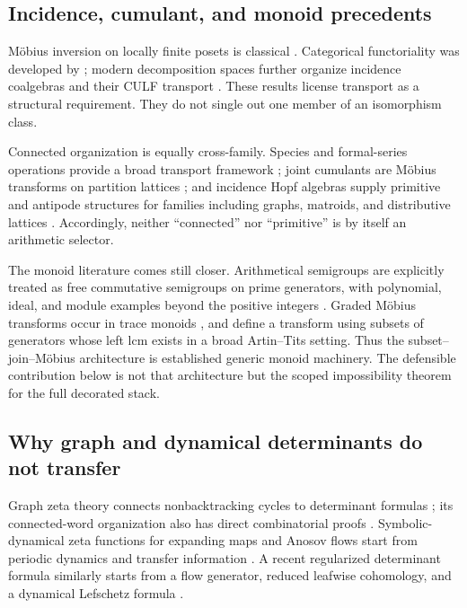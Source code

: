 \subsection{Incidence, cumulant, and monoid precedents}

M{\"o}bius inversion on locally finite posets is classical
\citep{Rota1964}.  Categorical functoriality was developed by
\citet{ContentLemayLeroux1980}; modern decomposition spaces further organize
incidence coalgebras and their CULF transport
\citep{GalvezKockTonks2018I,GalvezKockTonks2018III}.  These results license
transport as a structural requirement.  They do not single out one member
of an isomorphism class.

Connected organization is equally cross-family.  Species and formal-series
operations provide a broad transport framework \citep{Joyal1981}; joint
cumulants are M{\"o}bius transforms on partition lattices
\citep{Speed1983}; and incidence Hopf algebras supply primitive and antipode
structures for families including graphs, matroids, and distributive
lattices \citep{Schmitt1994}.  Accordingly, neither “connected” nor
“primitive” is by itself an arithmetic selector.

The monoid literature comes still closer.  Arithmetical semigroups are
explicitly treated as free commutative semigroups on prime generators, with
polynomial, ideal, and module examples beyond the positive integers
\citep{KnopfmacherEtAl1992}.  Graded M{\"o}bius transforms occur in trace
monoids \citep{Abbes2015}, and \citet{AbbesEtAl2019} define a transform using
subsets of generators whose left lcm exists in a broad Artin--Tits setting.
Thus the subset--join--M{\"o}bius architecture is established generic monoid
machinery.  The defensible contribution below is not that architecture but
the scoped impossibility theorem for the full decorated stack.

\subsection{Why graph and dynamical determinants do not transfer}

Graph zeta theory connects nonbacktracking cycles to determinant formulas
\citep{Bass1992}; its connected-word organization also has direct
combinatorial proofs \citep{FoataZeilberger1999}.  Symbolic-dynamical zeta
functions for expanding maps and Anosov flows start from periodic dynamics
and transfer information \citep{Ruelle1976}.  A recent regularized
determinant formula similarly starts from a flow generator, reduced leafwise
cohomology, and a dynamical Lefschetz formula
\citep{AlvarezKimMorishita2024}.

